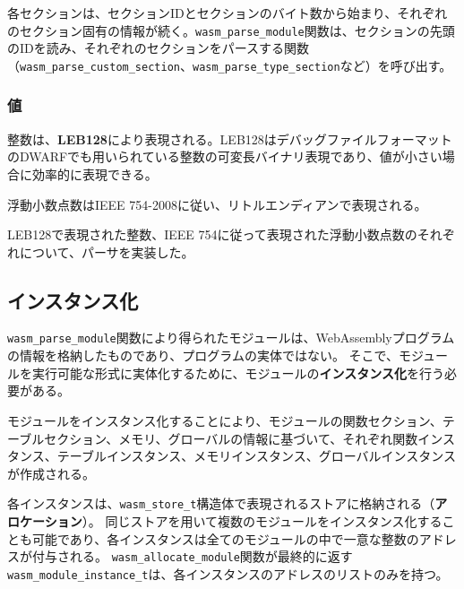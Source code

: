 各セクションは、セクションIDとセクションのバイト数から始まり、それぞれのセクション固有の情報が続く。\verb|wasm_parse_module|関数は、セクションの先頭のIDを読み、それぞれのセクションをパースする関数（\verb|wasm_parse_custom_section|、\verb|wasm_parse_type_section|など）を呼び出す。

\subsubsection{値}

整数は、{\bf LEB128}により表現される。LEB128はデバッグファイルフォーマットのDWARFでも用いられている\cite{dwarf}整数の可変長バイナリ表現であり、値が小さい場合に効率的に表現できる。

浮動小数点数はIEEE 754-2008\cite{ieee754}に従い、リトルエンディアンで表現される。

LEB128で表現された整数、IEEE 754に従って表現された浮動小数点数のそれぞれについて、パーサを実装した。




\subsection{インスタンス化}

\verb|wasm_parse_module|関数により得られたモジュールは、WebAssemblyプログラムの情報を格納したものであり、プログラムの実体ではない。
そこで、モジュールを実行可能な形式に実体化するために、モジュールの{\bf インスタンス化}を行う必要がある。

モジュールをインスタンス化することにより、モジュールの関数セクション、テーブルセクション、メモリ、グローバルの情報に基づいて、それぞれ関数インスタンス、テーブルインスタンス、メモリインスタンス、グローバルインスタンスが作成される。

各インスタンスは、\verb|wasm_store_t|構造体で表現されるストアに格納される（{\bf アロケーション}）。
同じストアを用いて複数のモジュールをインスタンス化することも可能であり、各インスタンスは全てのモジュールの中で一意な整数のアドレスが付与される。
\verb|wasm_allocate_module|関数が最終的に返す\verb|wasm_module_instance_t|は、各インスタンスのアドレスのリストのみを持つ。

